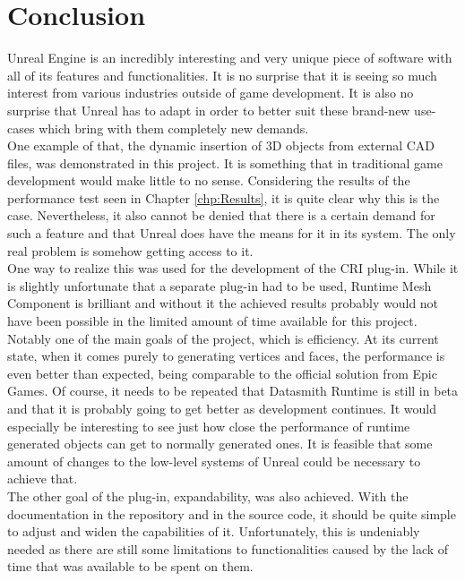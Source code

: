 \chapter{Conclusion}\label{chp:Conclusion}

Unreal Engine is an incredibly interesting and very unique piece of software with all of its features and functionalities. It is no surprise that it is seeing so much interest from various industries outside of game development. It is also no surprise that Unreal has to adapt in order to better suit these brand-new use-cases which bring with them completely new demands.\\
One example of that, the dynamic insertion of 3D objects from external CAD files, was demonstrated in this project. It is something that in traditional game development would make little to no sense. Considering the results of the performance test seen in Chapter \ref{chp:Results}, it is quite clear why this is the case. Nevertheless, it also cannot be denied that there is a certain demand for such a feature and that Unreal does have the means for it in its system. The only real problem is somehow getting access to it.\\
One way to realize this was used for the development of the \acs{CRI} plug-in. While it is slightly unfortunate that a separate plug-in had to be used, Runtime Mesh Component is brilliant and without it the achieved results probably would not have been possible in the limited amount of time available for this project. Notably one of the main goals of the project, which is efficiency. At its current state, when it comes purely to generating vertices and faces, the performance is even better than expected, being comparable to the official solution from Epic Games. Of course, it needs to be repeated that Datasmith Runtime is still in beta and that it is probably going to get better as development continues. It would especially be interesting to see just how close the performance of runtime generated objects can get to normally generated ones. It is feasible that some amount of changes to the low-level systems of Unreal could be necessary to achieve that.\\
The other goal of the plug-in, expandability, was also achieved. With the documentation in the repository and in the source code, it should be quite simple to adjust and widen the capabilities of it. Unfortunately, this is undeniably needed as there are still some limitations to functionalities caused by the lack of time that was available to be spent on them.\\
